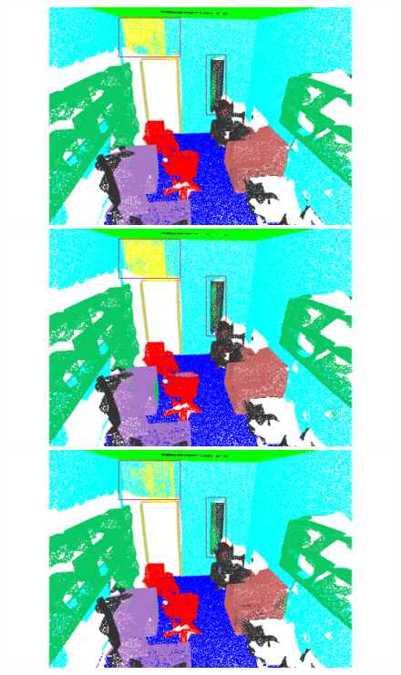\begin{figure}[htbp]
    \centering

    \begin{minipage}{0.02\textwidth}
        \centering
    \end{minipage}
    \hfill
    \begin{minipage}{0.185\textwidth}
        \centering
        \includegraphics[width=\textwidth]{fig/supplement/semantic_segmentation/office_9/DAPT_office_9.pdf}
    \end{minipage}
    \hfill
    \begin{minipage}{0.185\textwidth}
        \centering
        \includegraphics[width=\textwidth]{fig/supplement/semantic_segmentation/office_9/IDPT_office_9.pdf} %
    \end{minipage}
    \hfill
    \begin{minipage}{0.185\textwidth}
        \centering
        \includegraphics[width=\textwidth]{fig/supplement/semantic_segmentation/office_9/PointGST_office_9.pdf}

\end{minipage}
\end{figure}
